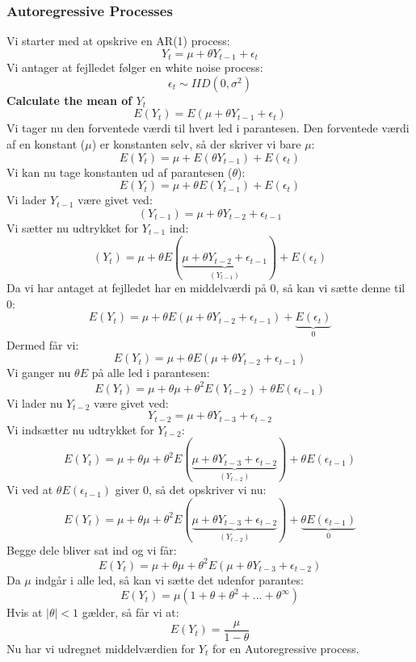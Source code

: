 \documentclass[
  10pt,
]{article}
\begin{document}
\newpage

\hypertarget{autoregressive-processes}{%
\subsubsection{Autoregressive
Processes}\label{autoregressive-processes}}

Vi starter med at opskrive en AR(1) process:\\
\[Y_t = \mu + \theta Y_{t-1} + \epsilon_t \] Vi antager at fejlledet
følger en white noise process:\\
\[\epsilon_t \sim IID(0,\sigma^2) \]
\textbf{Calculate the mean of $Y_t$}\\
\[E(Y_t) = E(\mu + \theta Y_{t-1} + \epsilon_t) \] Vi tager nu den
forventede værdi til hvert led i parantesen. Den forventede værdi af en
konstant (\(\mu\)) er konstanten selv, så der skriver vi bare \(\mu\):\\
\[E(Y_t) = \mu + E(\theta Y_{t-1}) + E(\epsilon_t) \] Vi kan nu tage
konstanten ud af parantesen (\(\theta\)):\\
\[E(Y_t) = \mu + \theta E(Y_{t-1}) + E(\epsilon_t) \] Vi lader
\(Y_{t-1}\) være givet ved:\\
\[(Y_{t-1}) = \mu + \theta Y_{t-2} + \epsilon_{t-1} \] Vi sætter nu
udtrykket for \(Y_{t-1}\) ind:\\
\[(Y_t{}) = \mu + \theta E(\underbrace{\mu + \theta Y_{t-2} + \epsilon_{t-1}}_\text{$(Y_{t-1})$}) + E(\epsilon_t) \]
Da vi har antaget at fejlledet har en middelværdi på 0, så kan vi sætte
denne til 0:\\
\[E(Y_t) = \mu + \theta E(\mu + \theta Y_{t-2} + \epsilon_{t-1}) + \underbrace{E(\epsilon_t)}_\text{0} \]
Dermed får vi:\\
\[E(Y_t) = \mu + \theta E(\mu + \theta Y_{t-2} + \epsilon_{t-1}) \] Vi
ganger nu \(\theta E\) på alle led i parantesen:\\
\[E(Y_t) = \mu + \theta \mu + \theta^2 E(Y_{t-2}) + \theta E(\epsilon_{t-1}) \]
Vi lader nu \(Y_{t-2}\) være givet ved:\\
\[Y_{t-2} = \mu + \theta Y_{t-3} + \epsilon_{t-2} \] Vi indsætter nu
udtrykket for \(Y_{t-2}\):\\
\[E(Y_t) = \mu + \theta \mu + \theta^2 E(\underbrace{\mu + \theta Y_{t-3} + \epsilon_{t-2}}_\text{$(Y_{t-2})$}) + \theta E(\epsilon_{t-1}) \]
Vi ved at \(\theta E(\epsilon_{t-1})\) giver 0, så det opskriver vi
nu:\\
\[E(Y_t) = \mu + \theta \mu + \theta^2 E(\underbrace{\mu + \theta Y_{t-3} + \epsilon_{t-2}}_\text{$(Y_{t-2})$}) + \underbrace{\theta E(\epsilon_{t-1})}_\text{0} \]
Begge dele bliver sat ind og vi får:\\
\[E(Y_t) = \mu + \theta \mu + \theta^2 E(\mu + \theta Y_{t-3} + \epsilon_{t-2}) \]
Da \(\mu\) indgår i alle led, så kan vi sætte det udenfor parantes:\\
\[E(Y_t) = \mu (1 + \theta + \theta^2 + ... + \theta^\infty) \] Hvis at
\(|\theta|<1\) gælder, så får vi at:\\
\[E(Y_t) =\frac{\mu}{1-\theta} \] Nu har vi udregnet middelværdien for
\(Y_t\) for en Autoregressive process.\\
\end{document}
